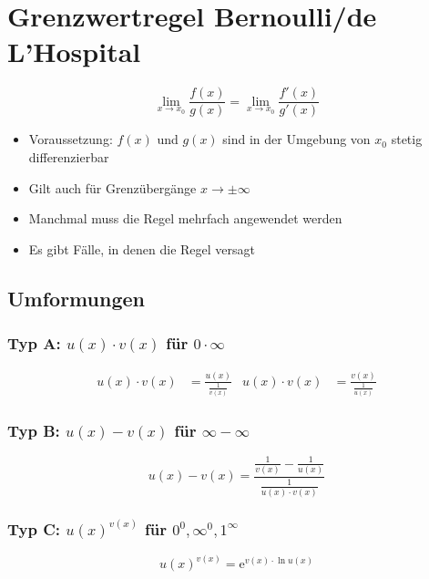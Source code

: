 \section{Grenzwertregel Bernoulli/de L'Hospital}
\begin{equation*}
	\lim_{x \to x_0} \frac{f(x)}{g(x)} = \lim_{x \to x_0} \frac{f'(x)}{g'(x)}
\end{equation*}
\begin{itemize}\itemsep0em
	\item Voraussetzung: $f(x)$ und $g(x)$ sind in der Umgebung von $x_0$ stetig differenzierbar
	\item Gilt auch für Grenzübergänge $x \to \pm \infty$
	\item Manchmal muss die Regel mehrfach angewendet werden
	\item Es gibt Fälle, in denen die Regel versagt
\end{itemize}

\subsection{Umformungen}
\subsubsection{Typ A: $u(x) \cdot v(x)$ für $0 \cdot \infty$}
\begin{align*}
	u(x) \cdot v(x)& = \frac{u(x)}{\frac{1}{v(x)}} & u(x) \cdot v(x)& = \frac{v(x)}{\frac{1}{u(x)}} 
\end{align*}

\subsubsection{Typ B: $u(x) - v(x)$ für $\infty - \infty$}
\begin{equation*}
	u(x) - v(x) = \frac{\frac{1}{v(x)} - \frac{1}{u(x)}}{\frac{1}{u(x) \cdot v(x)}}
\end{equation*}

\subsubsection{Typ C: $u(x)^{v(x)}$ für $0^0, \infty^0, 1^\infty$}
\begin{equation*}
	u(x)^{v(x)} = \mathrm e^{v(x) \cdot \ln u(x)}
\end{equation*}
